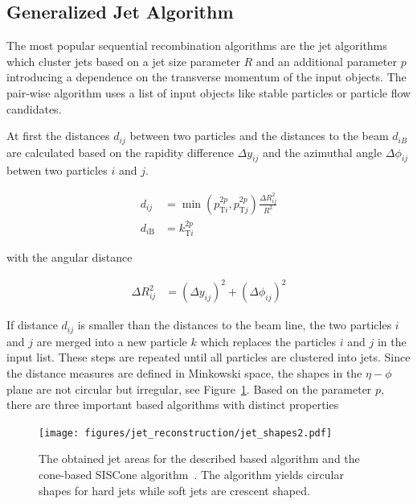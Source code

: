 \subsection{Generalized \kt Jet Algorithm}

The most popular sequential recombination algorithms are the \kt jet
algorithms which cluster jets based on a jet size parameter $R$ and an
additional parameter $p$ introducing a dependence on the transverse momentum of
the input objects. The pair-wise algorithm uses a list of input objects like stable
particles or particle flow candidates. 

At first the distances $d_{ij}$ between two particles and the distances to the
beam  $d_{iB}$ are calculated based on the rapidity difference $\Delta y_{ij}$
and the azimuthal angle $\Delta \phi_{ij}$ betwen two particles $i$ and $j$.

\begin{align} 
    d_{ij} &= \min(p_{\mathrm{T}i}^{2p},p_{\mathrm{T}j}^{2p})\frac{\Delta R_{ij}^2}{R^2}\\
    d_{i\mathrm{B}} &= k_{\mathrm{T}i}^{2p}
\end{align} 

with the angular distance

\begin{align}
    \Delta R_{ij}^2 &= (\Delta y_{ij})^2 + (\Delta \phi_{ij})^2
\end{align} 

If distance $d_{ij}$ is smaller than the distances to the beam line, the two
particles $i$ and $j$ are merged into a new particle $k$ which replaces the
particles $i$ and $j$ in the input list. These steps are repeated until all
particles are clustered into jets. Since the distance measures are defined in
Minkowski space, the shapes in the $\eta-\phi$ plane are not circular but
irregular, see Figure~\ref{fig:jet_shapes}. Based on the parameter $p$, there
are three important \kt based algorithms with distinct properties

\begin{figure}[htb]
    \centering
    \texttt{[image: figures/jet\_reconstruction/jet\_shapes2.pdf]}
    \caption{The obtained jet areas for the described \kt based algorithm
        and the cone-based SISCone algorithm~\cite{Salam:2009jx}. The \antikt
        algorithm yields circular shapes for hard jets while soft jets are crescent
        shaped.}
    \label{fig:jet_shapes}
\end{figure}

